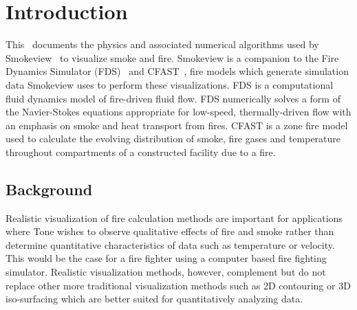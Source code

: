 

\section{Introduction}
This \paper\ documents the physics and associated numerical algorithms used by Smokeview~\cite{Smokeview_Users_Guide} to visualize smoke and fire.  Smokeview is a companion to the Fire Dynamics Simulator (FDS)~\cite{FDS_Math_Guide} and CFAST~\cite{Jones:2009}, fire models which generate   simulation data Smokeview uses to perform these visualizations. FDS is a computational fluid dynamics model of fire-driven fluid flow. FDS numerically solves a form of the Navier-Stokes equations appropriate for low-speed, thermally-driven flow with an emphasis on smoke and heat transport from fires.  CFAST is a zone fire model used to calculate the evolving distribution of smoke, fire gases and temperature throughout compartments of a constructed facility due to a fire.


\subsection{Background}

Realistic visualization of fire calculation methods are important for applications where Tone wishes to observe qualitative effects of fire and smoke rather than determine quantitative characteristics of data such as temperature or velocity.  This would be the case for a fire fighter using a computer based fire fighting simulator. Realistic visualization methods, however, complement but do not replace other more traditional visualization methods such as 2D contouring or 3D iso-surfacing which are better suited for quantitatively analyzing data.

